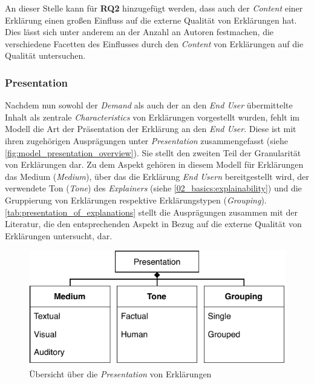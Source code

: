 \bigskip

An dieser Stelle kann für \textbf{RQ2} hinzugefügt werden, dass auch der \textit{Content} einer Erklärung einen großen Einfluss auf die externe Qualität von Erklärungen hat. Dies lässt sich unter anderem an der Anzahl an Autoren festmachen, die verschiedene Facetten des Einflusses durch den \textit{Content} von Erklärungen auf die Qualität untersuchen.

\subsubsection{Presentation}

Nachdem nun sowohl der \textit{Demand} als auch der an den \textit{End User} übermittelte Inhalt als zentrale \textit{Characteristics} von Erklärungen vorgestellt wurden, fehlt im Modell die Art der Präsentation der Erklärung an den \textit{End User}. Diese ist mit ihren zugehörigen Ausprägungen unter \textit{Presentation} zusammengefasst (siehe \autoref{fig:model_presentation_overview}). Sie stellt den zweiten Teil der Granularität von Erklärungen dar. Zu dem Aspekt gehören in diesem Modell für Erklärungen das Medium (\textit{Medium}), über das die Erklärung \textit{End Usern} bereitgestellt wird, der verwendete Ton (\textit{Tone}) des \textit{Explainers} (siehe \autoref{02_basics:explainability}) \cite[vgl.][]{chazette_knowledge_nodate} und die Gruppierung von Erklärungen respektive Erklärungstypen (\textit{Grouping}). \autoref{tab:presentation_of_explanations} stellt die Ausprägungen zusammen mit der Literatur, die den entsprechenden Aspekt in Bezug auf die externe Qualität von Erklärungen untersucht, dar.

\begin{figure}[t!]
    \begin{center}
        \includegraphics{contents/05_model_description/res/model_presentation_overview.pdf}
    \end{center}
    \caption{Übersicht über die \textit{Presentation} von Erklärungen}
    \label{fig:model_presentation_overview}
\end{figure}

